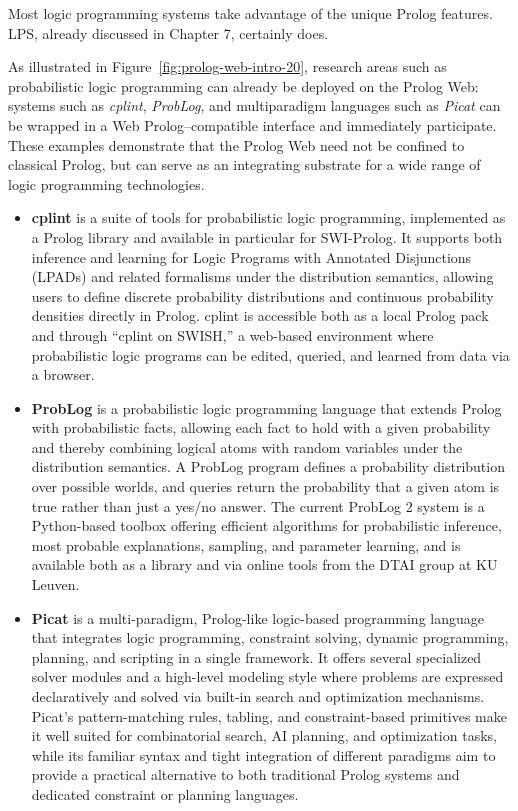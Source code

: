 Most logic programming systems take advantage of the unique Prolog features. LPS, already discussed in Chapter 7, certainly does.

As illustrated in Figure~\ref{fig:prolog-web-intro-20}, research areas such as probabilistic logic programming can already be deployed on the Prolog Web: systems such as \textit{cplint}, \textit{ProbLog}, and multiparadigm languages such as \textit{Picat} can be wrapped in a Web Prolog--compatible interface and immediately participate. These examples demonstrate that the Prolog Web need not be confined to classical Prolog, but can serve as an integrating substrate for a wide range of logic programming technologies.

\begin{itemize}
\item \textbf{cplint} is a suite of tools for probabilistic logic programming, implemented as a Prolog library and available in particular for SWI-Prolog. It supports both inference and learning for Logic Programs with Annotated Disjunctions (LPADs) and related formalisms under the distribution semantics, allowing users to define discrete probability distributions and continuous probability densities directly in Prolog. cplint is accessible both as a local Prolog pack and through ``cplint on SWISH,'' a web-based environment where probabilistic logic programs can be edited, queried, and learned from data via a browser.
\item \textbf{ProbLog} is a probabilistic logic programming language that extends Prolog with probabilistic facts, allowing each fact to hold with a given probability and thereby combining logical atoms with random variables under the distribution semantics. A ProbLog program defines a probability distribution over possible worlds, and queries return the probability that a given atom is true rather than just a yes/no answer. The current ProbLog 2 system is a Python-based toolbox offering efficient algorithms for probabilistic inference, most probable explanations, sampling, and parameter learning, and is available both as a library and via online tools from the DTAI group at KU Leuven. 
\item \textbf{Picat} is a multi-paradigm, Prolog-like logic-based programming language that integrates logic programming, constraint solving, dynamic programming, planning, and scripting in a single framework. It offers several specialized solver modules and a high-level modeling style where problems are expressed declaratively and solved via built-in search and optimization mechanisms. Picat's pattern-matching rules, tabling, and constraint-based primitives make it well suited for combinatorial search, AI planning, and optimization tasks, while its familiar syntax and tight integration of different paradigms aim to provide a practical alternative to both traditional Prolog systems and dedicated constraint or planning languages.
\end{itemize}

